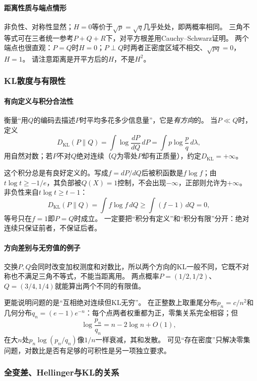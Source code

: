 \paragraph{距离性质与端点情形}

非负性、对称性显然；$H=0$等价于$\sqrt p=\sqrt q$几乎处处，即两概率相同。
三角不等式可在三者统一参考$P+Q+R$下，对平方根差用Cauchy–Schwarz证明。
两个端点也很直观：$P=Q$时$H=0$；$P\perp Q$时两者正密度区域不相交、$\sqrt{pq}=0$，$H=1$。
请注意距离是开平方后的$H$，不是$H^2$。

\subsubsection{KL散度与有限性}

\paragraph{有向定义与积分合法性}

衡量“用$Q$的编码去描述$P$时平均多花多少信息量”，它是\emph{有方向}的。
当$P\ll Q$时，定义
\[
 D_{\mathrm{KL}}(P\|Q)=\int\log\frac{dP}{dQ}\,dP
 =\int p\log\frac pq\,d\lambda,
\]
用自然对数；若$P$不对$Q$绝对连续（$Q$为零处$P$却有正质量），约定$D_{\mathrm{KL}}=+\infty$。

这个积分总是有良好定义的。写成$f=dP/dQ$后被积函数是$f\log f$；由$t\log t\geq-1/e$，其负部被$Q(X)=1$控制，不会出现$-\infty$，正部则允许为$+\infty$。
非负性来自$t\log t\geq t-1$：
\[
 D_{\mathrm{KL}}(P\|Q)=\int f\log f\,dQ\geq\int(f-1)\,dQ=0,
\]
等号只在$f=1$即$P=Q$时成立。
一定要把“积分有定义”和“积分有限”分开：绝对连续只保证前者，不保证后者。

\paragraph{方向差别与无穷值的例子}

交换$P,Q$会同时改变加权测度和对数比，所以两个方向的KL一般不同，它既不对称也不满足三角不等式，不能当距离用。
两点概率$P=(1/2,1/2)$、$Q=(3/4,1/4)$就能算出两个不同的有限值。

更能说明问题的是“互相绝对连续但KL无穷”。
在正整数上取重尾分布$p_n=c/n^2$和几何分布$q_n=(e-1)e^{-n}$：每个点两者权重都为正，零集关系完全相容；但
\[
 \log\frac{p_n}{q_n}=n-2\log n+O(1),
\]
在大$n$处$p_n\log(p_n/q_n)$像$1/n$一样衰减，其和发散。
可见“存在密度”只解决零集问题，对数比是否有足够的可积性是另一项独立要求。

\subsubsection{全变差、Hellinger与KL的关系}
\label{sec:measure-metric-relations}

